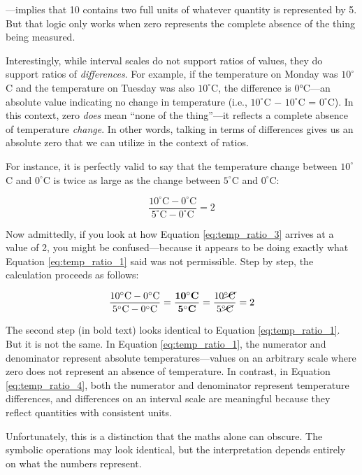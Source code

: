 —implies that 10 contains two full units of whatever quantity is represented by 5. But that logic only works when zero represents the complete absence of the thing being measured.

Interestingly, while interval scales do not support ratios of values, they do support ratios of \textit{differences}. For example, if the temperature on Monday was $10^\circ$C and the temperature on Tuesday was also $10^\circ$C, the difference is 0°C—an absolute value indicating no change in temperature (i.e., $10^\circ$C − $10^\circ$C = $0^\circ$C). In this context, zero \textit{does} mean ``none of the thing''—it reflects a complete absence of temperature \textit{change}. In other words, talking in terms of differences gives us an absolute zero that we can utilize in the context of ratios. 

For instance, it is perfectly valid to say that the temperature change between $10^\circ$C and $0^\circ$C is twice as large as the change between $5^\circ$C and $0^\circ$C:

\begin{equation}
\frac{10^\circ \text{C} - 0^\circ \text{C}}{5^\circ \text{C} - 0^\circ \text{C}} = 2
\label{eq:temp_ratio_3}
\end{equation}

Now admittedly, if you look at how Equation \ref{eq:temp_ratio_3} arrives at a value of 2, you might be confused—because it appears to be doing exactly what Equation \ref{eq:temp_ratio_1} said was not permissible. Step by step, the calculation proceeds as follows:

\begin{equation}
\frac{10^\circ \text{C} - 0^\circ \text{C}}{5^\circ \text{C} - 0^\circ \text{C}} = \mathbf{\frac{10^\circ \textbf{C}}{5^\circ \textbf{C}}} = \frac{10\cancel{^\circ \text{C}}}{5\cancel{^\circ \text{C}}} = 2
\label{eq:temp_ratio_4}
\end{equation}

The second step (in bold text) looks identical to Equation \ref{eq:temp_ratio_1}. But it is not the same. In Equation \ref{eq:temp_ratio_1}, the numerator and denominator represent absolute temperatures—values on an arbitrary scale where zero does not represent an absence of temperature. In contrast, in Equation \ref{eq:temp_ratio_4}, both the numerator and denominator represent temperature differences, and differences on an interval scale are meaningful because they reflect quantities with consistent units.

Unfortunately, this is a distinction that the maths alone can obscure. The symbolic operations may look identical, but the interpretation depends entirely on what the numbers represent.

